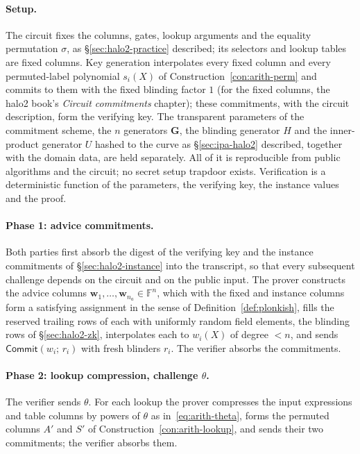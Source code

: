 \documentclass[11pt,a4paper]{article}
\theoremstyle{definition}
\newcommand{\F}{\mathbb{F}}
\newcommand{\Comm}{\mathsf{Commit}}
\begin{document}
\paragraph{Setup.}
The circuit fixes the columns, gates, lookup arguments and the equality
permutation $\sigma$, as \S\ref{sec:halo2-practice} described; its
selectors and lookup tables are fixed columns. Key generation
interpolates every fixed column and every permuted-label polynomial
$s_i(X)$ of Construction~\ref{con:arith-perm} and commits to them with
the fixed blinding factor $1$ (for the fixed columns, the halo2 book's
\emph{Circuit commitments} chapter); these commitments, with the circuit
description, form the verifying key. The transparent parameters of the
commitment scheme, the $n$ generators $\mathbf G$, the blinding
generator $H$ and the inner-product generator $U$ hashed to the curve as
\S\ref{sec:ipa-halo2} described, together with the domain data, are held
separately. All of it is reproducible from public algorithms and the
circuit; no secret setup trapdoor exists. Verification is a
deterministic function of the parameters, the verifying key, the
instance values and the proof.

\paragraph{Phase 1: advice commitments.}
Both parties first absorb the digest of the verifying key and the
instance commitments of \S\ref{sec:halo2-instance} into the
transcript, so that every subsequent challenge depends on the circuit and
on the public input. The prover constructs the advice columns
$\mathbf w_1, \dots, \mathbf w_{n_a} \in \F^{n}$, which with the fixed and
instance columns form a satisfying assignment in the sense of
Definition~\ref{def:plonkish}, fills the reserved trailing rows of each
with uniformly random field elements, the blinding rows of
\S\ref{sec:halo2-zk}, interpolates each to $w_i(X)$ of degree $< n$, and
sends $\Comm(w_i;\, r_i)$ with fresh blinders $r_i$. The verifier
absorbs the commitments.

\paragraph{Phase 2: lookup compression, challenge $\theta$.}
The verifier sends $\theta$. For each lookup the prover compresses the
input expressions and table columns by powers of $\theta$
as in~\eqref{eq:arith-theta}, forms the permuted columns $A'$ and $S'$ of
Construction~\ref{con:arith-lookup}, and sends their two commitments; the
verifier absorbs them.
\end{document}
